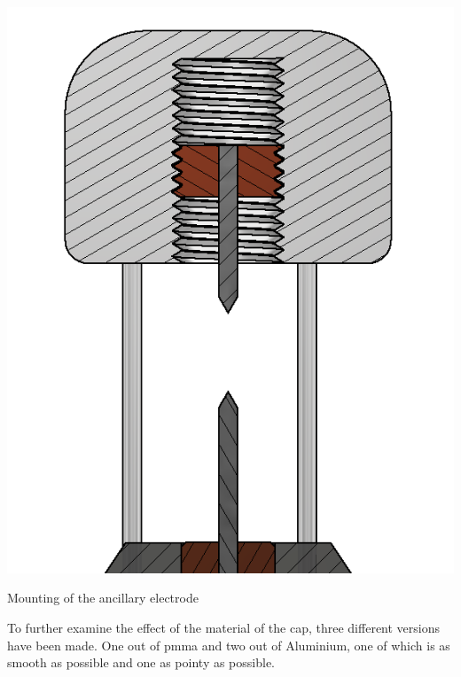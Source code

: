 \begin{marginfigure}[-3cm]
    \centering
    \includegraphics[width=\textwidth]{kassandra/resources/mirGehtsSuperDanke.png}
    \caption{Mounting of the ancillary electrode}
    \label{fig:ancillary-electrode}
\end{marginfigure}

To further examine the effect of the material of the cap, three different versions have been made. One out of \gls{pmma} and two out of Aluminium, one of which is as smooth as possible and one as pointy as possible.

